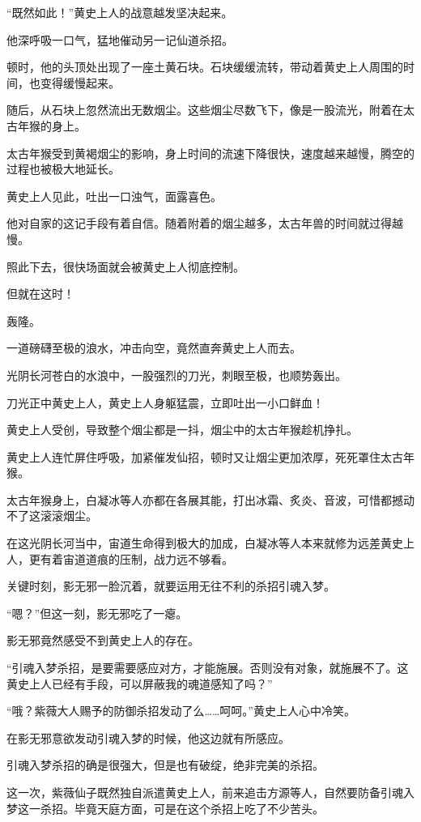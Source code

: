 \begin{this_body}
“既然如此！”黄史上人的战意越发坚决起来。

他深呼吸一口气，猛地催动另一记仙道杀招。

顿时，他的头顶处出现了一座土黄石块。石块缓缓流转，带动着黄史上人周围的时间，也变得缓慢起来。

随后，从石块上忽然流出无数烟尘。这些烟尘尽数飞下，像是一股流光，附着在太古年猴的身上。

太古年猴受到黄褐烟尘的影响，身上时间的流速下降很快，速度越来越慢，腾空的过程也被极大地延长。

黄史上人见此，吐出一口浊气，面露喜色。

他对自家的这记手段有着自信。随着附着的烟尘越多，太古年兽的时间就过得越慢。

照此下去，很快场面就会被黄史上人彻底控制。

但就在这时！

轰隆。

一道磅礴至极的浪水，冲击向空，竟然直奔黄史上人而去。

光阴长河苍白的水浪中，一股强烈的刀光，刺眼至极，也顺势轰出。

刀光正中黄史上人，黄史上人身躯猛震，立即吐出一小口鲜血！

黄史上人受创，导致整个烟尘都是一抖，烟尘中的太古年猴趁机挣扎。

黄史上人连忙屏住呼吸，加紧催发仙招，顿时又让烟尘更加浓厚，死死罩住太古年猴。

太古年猴身上，白凝冰等人亦都在各展其能，打出冰霜、炙炎、音波，可惜都撼动不了这滚滚烟尘。

在这光阴长河当中，宙道生命得到极大的加成，白凝冰等人本来就修为远差黄史上人，更有着宙道道痕的压制，战力远不够看。

关键时刻，影无邪一脸沉着，就要运用无往不利的杀招引魂入梦。

“嗯？”但这一刻，影无邪吃了一瘪。

影无邪竟然感受不到黄史上人的存在。

“引魂入梦杀招，是要需要感应对方，才能施展。否则没有对象，就施展不了。这黄史上人已经有手段，可以屏蔽我的魂道感知了吗？”

“哦？紫薇大人赐予的防御杀招发动了么……呵呵。”黄史上人心中冷笑。

在影无邪意欲发动引魂入梦的时候，他这边就有所感应。

引魂入梦杀招的确是很强大，但是也有破绽，绝非完美的杀招。

这一次，紫薇仙子既然独自派遣黄史上人，前来追击方源等人，自然要防备引魂入梦这一杀招。毕竟天庭方面，可是在这个杀招上吃了不少苦头。


\end{this_body}

